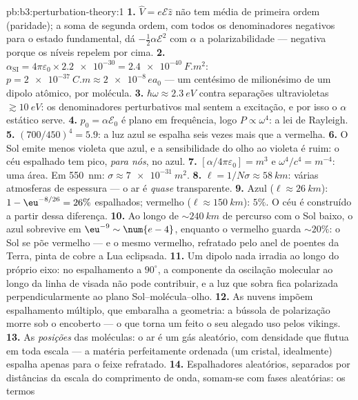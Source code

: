 \begin{solution}{pb:b3:perturbation-theory:1}
\textbf{1.} $\hat V = e\mathcal E\hat z$ não tem média de primeira
ordem (paridade); a soma de segunda ordem, com todos os denominadores
negativos para o estado fundamental, dá $-\tfrac12\alpha\mathcal E^2$
com $\alpha$ a polarizabilidade --- negativa porque os níveis repelem
por cima.
\textbf{2.} $\alpha_{\text{SI}} = 4\pi\varepsilon_0 \times
\num{2.2e-30} = \qty{2.4e-40}{F.m^2}$: $p = \qty{2e-37}{C.m}
\approx \num{2e-8}\,ea_0$ --- um centésimo de milionésimo de um dipolo
atômico, por molécula.
\textbf{3.} $\hbar\omega \approx \qty{2.3}{eV}$ contra separações
ultravioletas $\gtrsim\qty{10}{eV}$: os denominadores perturbativos mal
sentem a excitação, e por isso o $\alpha$ estático serve.
\textbf{4.} $p_0 = \alpha\mathcal E_0$ é plano em frequência, logo $P
\propto \omega^4$: a lei de Rayleigh.
\textbf{5.} $(700/450)^4 = 5.9$: a luz azul se espalha seis vezes mais
que a vermelha.
\textbf{6.} O Sol emite menos violeta que azul, e a sensibilidade do
olho ao violeta é ruim: o céu espalhado tem pico, \emph{para nós}, no
azul.
\textbf{7.} $[\alpha/4\pi\varepsilon_0] = \unit{m^3}$ e
$\omega^4/c^4 = \unit{m^{-4}}$: uma área. Em \qty{550}{nm}:
$\sigma \approx \qty{7e-31}{m^2}$.
\textbf{8.} $\ell = 1/N\sigma \approx \qty{58}{km}$: várias atmosferas
de espessura --- o ar é \emph{quase} transparente.
\textbf{9.} Azul ($\ell \approx \qty{26}{km}$): $1 -
\eu^{-8/26} = 26\%$ espalhados; vermelho ($\ell \approx \qty{150}{km}$):
$5\%$. O céu é construído a partir dessa diferença.
\textbf{10.} Ao longo de $\sim\qty{240}{km}$ de percurso com o Sol
baixo, o azul sobrevive em $\eu^{-9} \sim \num{e-4}$, enquanto o
vermelho guarda $\sim20\%$: o Sol se põe vermelho --- e o mesmo
vermelho, refratado pelo anel de poentes da Terra, pinta de cobre a Lua
eclipsada.
\textbf{11.} Um dipolo nada irradia ao longo do próprio eixo: no
espalhamento a $90^\circ$, a componente da oscilação molecular ao longo
da linha de visada não pode contribuir, e a luz que sobra fica
polarizada perpendicularmente ao plano Sol--molécula--olho.
\textbf{12.} As nuvens impõem espalhamento múltiplo, que embaralha a
geometria: a bússola de polarização morre sob o encoberto --- o que
torna um feito o seu alegado uso pelos vikings.
\textbf{13.} As \emph{posições} das moléculas: o ar é um gás aleatório,
com densidade que flutua em toda escala --- a matéria perfeitamente
ordenada (um cristal, idealmente) espalha apenas para o feixe
refratado.
\textbf{14.} Espalhadores aleatórios, separados por distâncias da
escala do comprimento de onda, somam-se com fases aleatórias: os termos

\end{solution}

